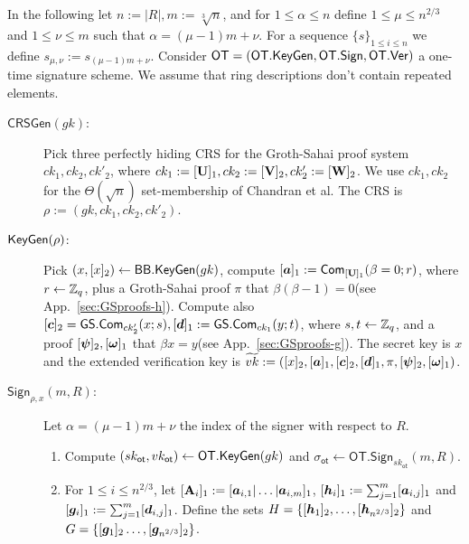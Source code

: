 
In the following let $n:=|R|, m:=\sqrt[3]{n}$, and for $1\leq \alpha\leq n$ define $1\leq \mu \leq n^{2/3}$ and $1\leq \nu\leq m$ such that $\alpha=(\mu-1)m+\nu$. For a sequence $\{s\}_{1\leq i\leq n}$ we define $s_{\mu,\nu}:=s_{(\mu-1)m+\nu}$. Consider $\mathsf{OT}=(\mathsf{OT}.\mathsf{KeyGen},\mathsf{OT}.\mathsf{Sign},\allowbreak\mathsf{OT}.\mathsf{Ver})$ a one-time signature scheme. We assume that ring descriptions don't contain repeated elements.

\begin{description}
\item[$\mathsf{CRSGen}(gk)$:] Pick three perfectly hiding CRS for the Groth-Sahai proof system $ck_1,ck_2,ck'_2$, where $ck_1 := [\mathbf{{U}}]_1,ck_2 :=[\mathbf{{V}}]_2,ck'_2:=[\mathbf{{W}}]_2$. We use $ck_1,ck_2$ for the $\Theta(\sqrt{n})$ set-membership of Chandran et al. The CRS is $\rho:=(gk,ck_1,ck_2,ck'_2).$

\item[$\mathsf{KeyGen}(\rho)$:] Pick $(x,[x]_2)\gets\mathsf{BB}.\mathsf{KeyGen}(gk)$, compute $[{\boldsymbol{a}}]_1:=\mathsf{Com}_{[\mathbf{{U}}]_1}(\beta = 0;r)$, where $r\gets\mathbb{Z}_q$, plus a Groth-Sahai proof $\pi$ that $\beta(\beta-1)=0$\ifPKC\else (see App.~\ref{sec:GSproofs-h})\fi. Compute also $[{\boldsymbol{c}}]_2 = {\mathsf{GS}}.\mathsf{Com}_{ck'_2}(x;s),[{\boldsymbol{d}}]_1 := {\mathsf{GS}}.\mathsf{Com}_{ck_1}(y;t)$, where $s,t\gets\mathbb{Z}_q$, and a proof $[{\boldsymbol{\psi}}]_2,[{\boldsymbol{\omega}}]_1$ that $\beta x = y$\ifPKC\else (see App.~\ref{sec:GSproofs-g})\fi. The secret key is $x$ and the extended verification key is $\widetilde{vk}:=([x]_2,[{\boldsymbol{a}}]_1,[{\boldsymbol{c}}]_2,\allowbreak[{\boldsymbol{d}}]_1,\pi,[{\boldsymbol{\psi}}]_2,[{\boldsymbol{\omega}}]_1)$.

\item[$\mathsf{Sign}_{\rho,x}(m,R)$:] Let $\alpha=(\mu-1)m+\nu$ the index of the signer with respect to $R$.
\begin{enumerate}
\item Compute $(sk_\mathsf{ot},vk_\mathsf{ot})\gets\mathsf{OT}.\mathsf{KeyGen}(gk)$ and $\sigma_\mathsf{ot}\gets\allowbreak\mathsf{OT}.\allowbreak\mathsf{Sign}_{sk_\mathsf{ot}}(m,R)$.

\item For $1\leq i \leq n^{2/3}$, let $[\mathbf{{A}}_i]_1:=[{\boldsymbol{a}}_{i,1}|\allowbreak\ldots|\allowbreak{\boldsymbol{a}}_{i,m}]_1$, $[{\boldsymbol{h}}_i]_1 := \sum_{j=1}^m[{\boldsymbol{a}}_{i,j}]_1$ and $[{\boldsymbol{g}}_i]_1:=\sum_{j=1}^{m}[{\boldsymbol{d}}_{i,j}]_1$. Define the sets
$H=\{[{\boldsymbol{h}}_1]_2,\ldots,[{\boldsymbol{h}}_{n^{2/3}}]_2\}$ and
$G=\{
	[{\boldsymbol{g}}_1]_2
	\allowbreak\ldots,\allowbreak
	[{\boldsymbol{g}}_{n^{2/3}}]_2\}$.


\end{enumerate}
\end{description}
